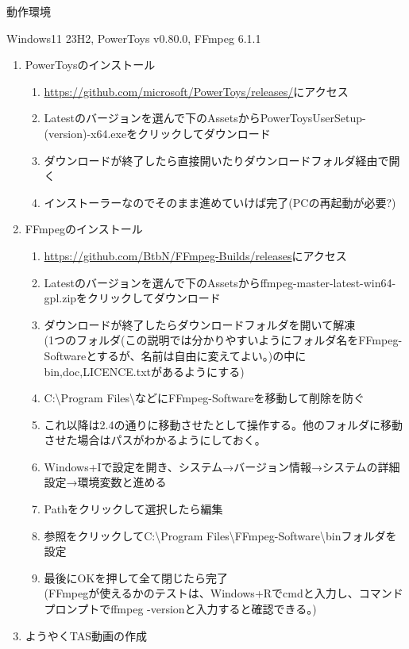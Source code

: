 \documentclass[fontsize=11bp,paper=a4paper]{jlreq}
\begin{document}
\noindent 動作環境

\noindent Windows11 23H2, PowerToys v0.80.0, FFmpeg 6.1.1
\begin{enumerate}
\item PowerToysのインストール
\begin{enumerate}
\item \url{https://github.com/microsoft/PowerToys/releases/}にアクセス
\item Latestのバージョンを選んで下のAssetsからPowerToysUserSetup-(version)-x64.exeをクリックしてダウンロード
\item ダウンロードが終了したら直接開いたりダウンロードフォルダ経由で開く
\item インストーラーなのでそのまま進めていけば完了(PCの再起動が必要?)
\end{enumerate}
\item FFmpegのインストール
\begin{enumerate}
\item \url{https://github.com/BtbN/FFmpeg-Builds/releases}にアクセス
\item Latestのバージョンを選んで下のAssetsからffmpeg-master-latest-win64-gpl.zipをクリックしてダウンロード
\item ダウンロードが終了したらダウンロードフォルダを開いて解凍 \\
\noindent (1つのフォルダ(この説明では分かりやすいようにフォルダ名をFFmpeg-Softwareとするが、名前は自由に変えてよい。)の中にbin,doc,LICENCE.txtがあるようにする)
\item C:\textbackslash Program Files\textbackslash などにFFmpeg-Softwareを移動して削除を防ぐ
\item これ以降は2.4の通りに移動させたとして操作する。他のフォルダに移動させた場合はパスがわかるようにしておく。
\item Windows+Iで設定を開き、システム→バージョン情報→システムの詳細設定→環境変数と進める
\item Pathをクリックして選択したら編集
\item 参照をクリックしてC:\textbackslash Program Files\textbackslash FFmpeg-Software\textbackslash binフォルダを設定
\item 最後にOKを押して全て閉じたら完了 \\
\noindent (FFmpegが使えるかのテストは、Windows+Rでcmdと入力し、コマンドプロンプトでffmpeg -versionと入力すると確認できる。)
\end{enumerate}
\item ようやくTAS動画の作成
\begin{enumerate}

\end{enumerate}
\end{enumerate}
\end{document}
